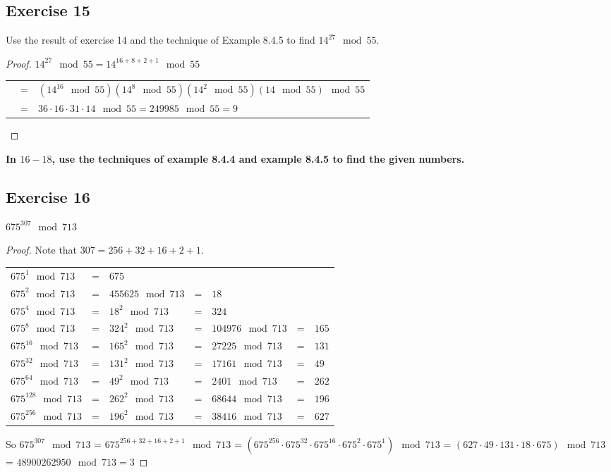 \documentclass[14pt]{extarticle}
\newcommand{\cy}{\color{cyan}}
\begin{document}
\subsection{Exercise 15}
Use the result of exercise 14 and the technique of Example 8.4.5 to find \(14^{27} \mod 55\).

\begin{proof}
\(14^{27} \mod 55 = 14^{16+8+2+1} \mod 55\)

\begin{tabular}{rcl}
& = & \((14^{16} \mod 55)(14^8 \mod 55)(14^2 \mod 55)(14 \mod 55) \mod 55\) \\
& = & \(36 \cdot 16 \cdot 31 \cdot 14 \mod 55 = 249985 \mod 55 = 9\)
\end{tabular}
\end{proof}

{\bf \cy In $16-18$, use the techniques of example 8.4.4 and example 8.4.5 to find the given numbers.}

\subsection{Exercise 16}
\(675^{307} \mod 713\)

\begin{proof}
Note that \(307 = 256 + 32 + 16 + 2 + 1\).

\begin{tabular}{lclclcl}
\(675^1 \mod 713\) & = & \(675\) \\
\(675^2 \mod 713\) & = & \(455625 \mod 713\) & = & \(18\)\\
\(675^4 \mod 713\) & = & \(18^2 \mod 713\) & = & \(324\) \\
\(675^8 \mod 713\) & = & \(324^2 \mod 713\) & = & \(104976 \mod 713\) & = & \(165\) \\
\(675^{16} \mod 713\) & = & \(165^2 \mod 713\) & = & \(27225 \mod 713\) & = & \(131\) \\
\(675^{32} \mod 713\) & = & \(131^2 \mod 713\) & = & \(17161 \mod 713\) & = & \(49\) \\
\(675^{64} \mod 713\) & = & \(49^2 \mod 713\) & = & \(2401 \mod 713\) & = & \(262\) \\
\(675^{128} \mod 713\) & = & \(262^2 \mod 713\) & = & \(68644 \mod 713\) & = & \(196\) \\
\(675^{256} \mod 713\) & = & \(196^2 \mod 713\) & = & \(38416 \mod 713\) & = & \(627\)
\end{tabular}

So \(675^{307} \mod 713\) = \(675^{256 + 32 + 16 + 2 + 1} \mod 713\) = \((675^{256} \cdot 675^{32} \cdot 675^{16} 
\cdot 675^{2} \cdot 675^{1}) \mod 713\) = \((627 \cdot 49 \cdot 131 \cdot 18 \cdot 675) \mod 713\) = \(48900262950 
\mod 713 = 3\)
\end{proof}
\end{document}
